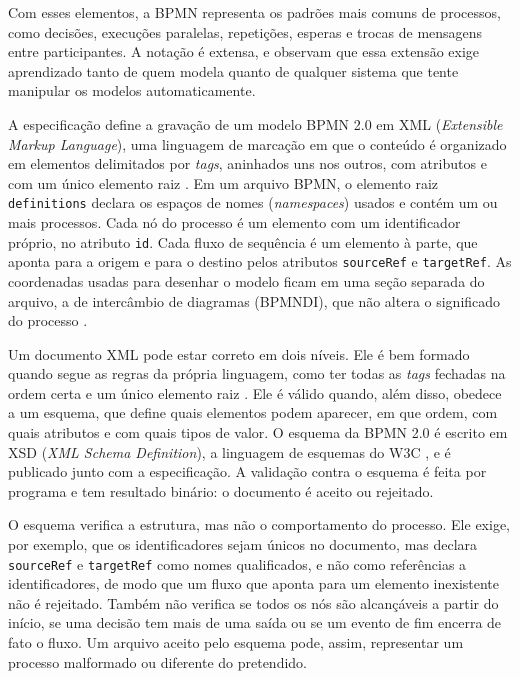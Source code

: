 Com esses elementos, a BPMN representa os padrões mais comuns de processos, como decisões, execuções paralelas, repetições, esperas e trocas de mensagens entre participantes. A notação é extensa, e  observam que essa extensão exige aprendizado tanto de quem modela quanto de qualquer sistema que tente manipular os modelos automaticamente.

A especificação define a gravação de um modelo BPMN 2.0 em XML (\textit{Extensible Markup Language}), uma linguagem de marcação em que o conteúdo é organizado em elementos delimitados por \textit{tags}, aninhados uns nos outros, com atributos e com um único elemento raiz \cite{bray2008xml}. Em um arquivo BPMN, o elemento raiz \texttt{definitions} declara os espaços de nomes (\textit{namespaces}) usados e contém um ou mais processos. Cada nó do processo é um elemento com um identificador próprio, no atributo \texttt{id}. Cada fluxo de sequência é um elemento à parte, que aponta para a origem e para o destino pelos atributos \texttt{sourceRef} e \texttt{targetRef}. As coordenadas usadas para desenhar o modelo ficam em uma seção separada do arquivo, a de intercâmbio de diagramas (BPMNDI), que não altera o significado do processo \cite{omg2011bpmn}.

Um documento XML pode estar correto em dois níveis. Ele é bem formado quando segue as regras da própria linguagem, como ter todas as \textit{tags} fechadas na ordem certa e um único elemento raiz \cite{bray2008xml}. Ele é válido quando, além disso, obedece a um esquema, que define quais elementos podem aparecer, em que ordem, com quais atributos e com quais tipos de valor. O esquema da BPMN 2.0 é escrito em XSD (\textit{XML Schema Definition}), a linguagem de esquemas do W3C \cite{thompson2004xmlschema}, e é publicado junto com a especificação. A validação contra o esquema é feita por programa e tem resultado binário: o documento é aceito ou rejeitado.

O esquema verifica a estrutura, mas não o comportamento do processo. Ele exige, por exemplo, que os identificadores sejam únicos no documento, mas declara \texttt{sourceRef} e \texttt{targetRef} como nomes qualificados, e não como referências a identificadores, de modo que um fluxo que aponta para um elemento inexistente não é rejeitado. Também não verifica se todos os nós são alcançáveis a partir do início, se uma decisão tem mais de uma saída ou se um evento de fim encerra de fato o fluxo. Um arquivo aceito pelo esquema pode, assim, representar um processo malformado ou diferente do pretendido.

